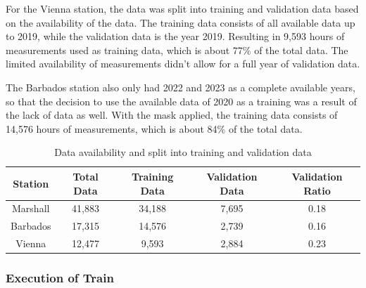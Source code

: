 For the Vienna station, the data was split into training and validation data based on the availability of the data. The training data consists of all available data up to 2019, while the validation data is the year 2019. Resulting in 9,593 hours of measurements used as training data, which is about 77\% of the total data. The limited availability of measurements didn't allow for a full year of validation data.

The Barbados station also only had 2022 and 2023 as a complete available years, so that the decision to use the available data of 2020 as a training was a result of the lack of data as well. With the mask applied, the training data consists of 14,576 hours of measurements, which is about 84\% of the total data.






\begin{table}
    \centering
    \begin{tabular}{|c|c|c|c|c|}
        \hline
        Station & Total Data & Training Data & Validation Data & Validation Ratio \\
        \hline
        Marshall & 41,883 & 34,188 & 7,695 & 0.18 \\
        Barbados & 17,315 & 14,576 & 2,739 & 0.16 \\
        Vienna & 12,477 & 9,593 & 2,884 & 0.23 \\
        \hline
    \end{tabular}
    \caption{Data availability and split into training and validation data}
    \label{tab:data_split}
\end{table}

\subsubsection*{Execution of Train}

